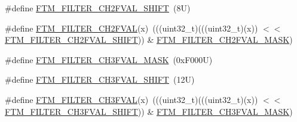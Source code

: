 \begin{DoxyCompactItemize}
\#define \mbox{\hyperlink{group___f_t_m___register___masks_ga9d2eef1684a2f4dbb28931408cf3248f}{F\+T\+M\+\_\+\+F\+I\+L\+T\+E\+R\+\_\+\+C\+H2\+F\+V\+A\+L\+\_\+\+S\+H\+I\+FT}}~(8\+U)
\item 
\#define \mbox{\hyperlink{group___f_t_m___register___masks_ga56a86c7e68150dbdb4b8df6b3762d46d}{F\+T\+M\+\_\+\+F\+I\+L\+T\+E\+R\+\_\+\+C\+H2\+F\+V\+AL}}(x)~(((uint32\+\_\+t)(((uint32\+\_\+t)(x)) $<$$<$ \mbox{\hyperlink{group___f_t_m___register___masks_ga9d2eef1684a2f4dbb28931408cf3248f}{F\+T\+M\+\_\+\+F\+I\+L\+T\+E\+R\+\_\+\+C\+H2\+F\+V\+A\+L\+\_\+\+S\+H\+I\+FT}})) \& \mbox{\hyperlink{group___f_t_m___register___masks_ga33bec78729047fa99f4534d68d36f696}{F\+T\+M\+\_\+\+F\+I\+L\+T\+E\+R\+\_\+\+C\+H2\+F\+V\+A\+L\+\_\+\+M\+A\+SK}})
\item 
\#define \mbox{\hyperlink{group___f_t_m___register___masks_gadced1643670251bc672a6903b3cd7f29}{F\+T\+M\+\_\+\+F\+I\+L\+T\+E\+R\+\_\+\+C\+H3\+F\+V\+A\+L\+\_\+\+M\+A\+SK}}~(0x\+F000\+U)
\item 
\#define \mbox{\hyperlink{group___f_t_m___register___masks_ga23a151bbeb877a2e2790071b9947bc30}{F\+T\+M\+\_\+\+F\+I\+L\+T\+E\+R\+\_\+\+C\+H3\+F\+V\+A\+L\+\_\+\+S\+H\+I\+FT}}~(12\+U)
\item 
\#define \mbox{\hyperlink{group___f_t_m___register___masks_ga777ead7813671a9cacf617c172c1181b}{F\+T\+M\+\_\+\+F\+I\+L\+T\+E\+R\+\_\+\+C\+H3\+F\+V\+AL}}(x)~(((uint32\+\_\+t)(((uint32\+\_\+t)(x)) $<$$<$ \mbox{\hyperlink{group___f_t_m___register___masks_ga23a151bbeb877a2e2790071b9947bc30}{F\+T\+M\+\_\+\+F\+I\+L\+T\+E\+R\+\_\+\+C\+H3\+F\+V\+A\+L\+\_\+\+S\+H\+I\+FT}})) \& \mbox{\hyperlink{group___f_t_m___register___masks_gadced1643670251bc672a6903b3cd7f29}{F\+T\+M\+\_\+\+F\+I\+L\+T\+E\+R\+\_\+\+C\+H3\+F\+V\+A\+L\+\_\+\+M\+A\+SK}})
\end{DoxyCompactItemize}
